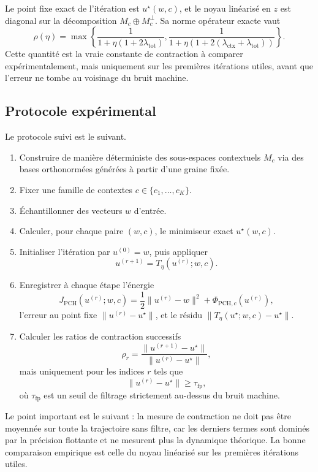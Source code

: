\documentclass[11pt,a4paper]{article}
\newcommand{\1}{\mathbf 1}
\begin{document}
Le point fixe exact de l'itération est \(u^\star(w,c)\), et le noyau linéarisé en \(z\) est diagonal sur la décomposition \(M_c\oplus M_c^\perp\). Sa norme opérateur exacte vaut
\[
\rho(\eta)
=
\max\left\{
\frac{1}{1+\eta(1+2\lambda_{\mathrm{tot}})},
\frac{1}{1+\eta(1+2(\lambda_{\mathrm{ctx}}+\lambda_{\mathrm{tot}}))}
\right\}.
\]
Cette quantité est la vraie constante de contraction à comparer expérimentalement, mais uniquement sur les premières itérations utiles, avant que l'erreur ne tombe au voisinage du bruit machine.

\subsection{Protocole expérimental}

Le protocole suivi est le suivant.

\begin{enumerate}
    \item Construire de manière déterministe des sous-espaces contextuels \(M_c\) via des bases orthonormées générées à partir d'une graine fixée.
    \item Fixer une famille de contextes \(c\in\{c_1,\dots,c_K\}\).
    \item Échantillonner des vecteurs \(w\) d'entrée.
    \item Calculer, pour chaque paire \((w,c)\), le minimiseur exact \(u^\star(w,c)\).
    \item Initialiser l'itération par \(u^{(0)}=w\), puis appliquer
    \[
    u^{(r+1)}=T_\eta(u^{(r)};w,c).
    \]
    \item Enregistrer à chaque étape l'énergie
    \[
    J_{\mathrm{PCH}}(u^{(r)};w,c)
    =
    \frac12\|u^{(r)}-w\|^2+\Phi_{\mathrm{PCH},c}(u^{(r)}),
    \]
    l'erreur au point fixe \(\|u^{(r)}-u^\star\|\), et le résidu \(\|T_\eta(u^\star;w,c)-u^\star\|\).
    \item Calculer les ratios de contraction successifs
    \[
    \rho_r
    =
    \frac{\|u^{(r+1)}-u^\star\|}{\|u^{(r)}-u^\star\|},
    \]
    mais uniquement pour les indices \(r\) tels que
    \[
    \|u^{(r)}-u^\star\| \ge \tau_{\mathrm{fp}},
    \]
    où \(\tau_{\mathrm{fp}}\) est un seuil de filtrage strictement au-dessus du bruit machine.
\end{enumerate}

Le point important est le suivant : la mesure de contraction ne doit pas être moyennée sur toute la trajectoire sans filtre, car les derniers termes sont dominés par la précision flottante et ne mesurent plus la dynamique théorique. La bonne comparaison empirique est celle du noyau linéarisé sur les premières itérations utiles.
\end{document}
